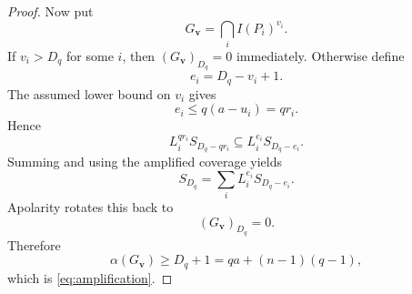 \documentclass[10pt,a4paper]{amsart}
\begin{document}
\begin{proof}
Now put
\[
  G_{\mathbf v}=\bigcap_iI(P_i)^{v_i}.
\]
If $v_i>D_q$ for some $i$, then $(G_{\mathbf v})_{D_q}=0$ immediately.  Otherwise define
\[
  e_i=D_q-v_i+1.
\]
The assumed lower bound on $v_i$ gives
\[
  e_i\le q(a-u_i)=qr_i.
\]
Hence
\[
  L_i^{qr_i}S_{D_q-qr_i}
  \subseteq
  L_i^{e_i}S_{D_q-e_i}.
\]
Summing and using the amplified coverage yields
\[
  S_{D_q}=\sum_iL_i^{e_i}S_{D_q-e_i}.
\]
Apolarity rotates this back to
\[
  (G_{\mathbf v})_{D_q}=0.
\]
Therefore
\[
  \alpha(G_{\mathbf v})\ge D_q+1
  =qa+(n-1)(q-1),
\]
which is \eqref{eq:amplification}.
\end{proof}
\end{document}
